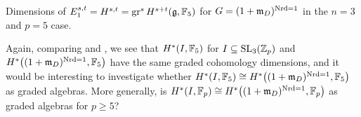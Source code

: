 \begin{table}[ht]
  \centering
  \caption[Graded cohomology dimensions for the Lazard Lie algebra of $(1+\idm_{D})^{\Nrd = 1}$ in the $n=3$ and $p=5$ case]{Dimensions of $E_{1}^{s,t} = H^{s,t} = \operatorname{gr}^{s} H^{s+t}(\mathfrak{g},\mathbb{F}_{5})$ for $G = (1+\mathfrak{m}_{D})^{\operatorname{Nrd} = 1}$ in the $n=3$ and $p=5$ case.}
  \label{tab:graded-coh-dims-central-div-alg-3-prime}
  \renewcommand{\arraystretch}{1.7}
  \renewcommand{\arraystretch}{1}
\end{table}

Again, comparing  and , we see that $H^{*}(I,\mathbb{F}_{5})$ for $I \subseteq \operatorname{SL}_{3}(\mathbb{Z}_{p})$ and $H^{*}\bigl((1+\mathfrak{m}_{D})^{\operatorname{Nrd} = 1},\mathbb{F}_{5}\bigr)$ have the same graded cohomology dimensions, and it would be interesting to investigate whether $H^{*}(I,\mathbb{F}_{5}) \cong H^{*}\bigl((1+\mathfrak{m}_{D})^{\operatorname{Nrd} = 1},\mathbb{F}_{5}\bigr)$ as graded algebras. More generally, is $H^{*}(I,\mathbb{F}_{p}) \cong H^{*}\bigl((1+\mathfrak{m}_{D})^{\operatorname{Nrd} = 1},\mathbb{F}_{p}\bigr)$ as graded algebras for $p \geq 5$?


